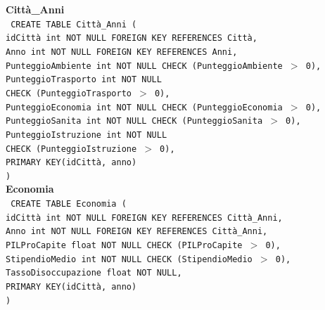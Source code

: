 \documentclass[a4paper,12pt]{report}
\begin{document}
                \noindent
                {\large \textbf{Città\_Anni}} \\
                \texttt{
                    CREATE TABLE Città\_Anni ( \\
                    \null\quad\quad idCittà int NOT NULL FOREIGN KEY REFERENCES Città, \\
                    \null\quad\quad Anno int NOT NULL FOREIGN KEY REFERENCES Anni, \\
                    \null\quad\quad PunteggioAmbiente       int     NOT NULL CHECK (PunteggioAmbiente $>$ 0), \\
                    \null\quad\quad PunteggioTrasporto      int     NOT NULL \\
                            \null\qquad\qquad CHECK (PunteggioTrasporto $>$ 0), \\
                    \null\quad\quad PunteggioEconomia       int     NOT NULL CHECK (PunteggioEconomia $>$ 0), \\
                    \null\quad\quad PunteggioSanita         int     NOT NULL CHECK (PunteggioSanita $>$ 0), \\
                    \null\quad\quad PunteggioIstruzione     int     NOT NULL \\
                            \null\qquad\qquad CHECK (PunteggioIstruzione $>$ 0), \\
                    \null\quad\quad PRIMARY KEY(idCittà, anno) \\
                    )
                } \\

                \noindent
                {\large \textbf{Economia}} \\
                \texttt{
                    CREATE TABLE Economia ( \\
                    \null\quad\quad idCittà int NOT NULL FOREIGN KEY REFERENCES Città\_Anni, \\
                    \null\quad\quad Anno int NOT NULL FOREIGN KEY REFERENCES Città\_Anni, \\
                    \null\quad\quad PILProCapite            float   NOT NULL CHECK (PILProCapite $>$ 0), \\
                    \null\quad\quad StipendioMedio          int     NOT NULL CHECK (StipendioMedio $>$ 0), \\
                    \null\quad\quad TassoDisoccupazione     float   NOT NULL, \\
                    \null\quad\quad PRIMARY KEY(idCittà, anno) \\
                    )
                } \\
\end{document}
